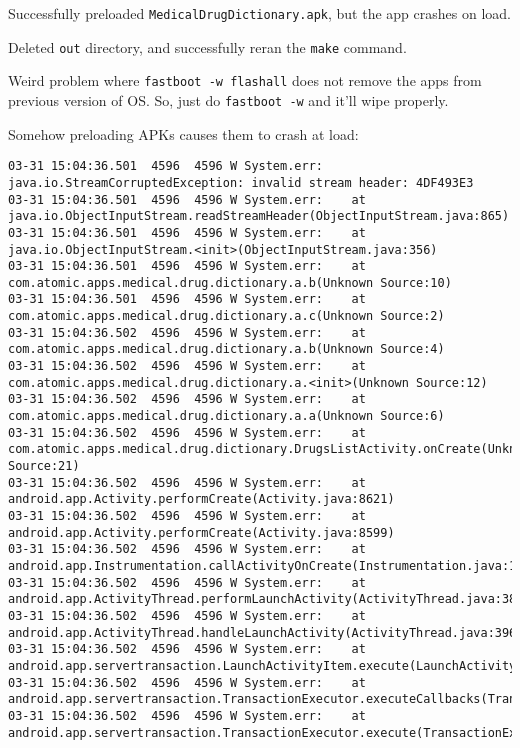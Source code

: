 Successfully preloaded \texttt{MedicalDrugDictionary.apk}, but the app crashes on load.

Deleted \texttt{out} directory, and successfully reran the \texttt{make} command.

Weird problem where \texttt{fastboot -w flashall} does not remove the apps from previous version of OS. So, just do \texttt{fastboot -w} and it'll wipe properly.

Somehow preloading APKs causes them to crash at load:
\begin{lstlisting}
03-31 15:04:36.501  4596  4596 W System.err: java.io.StreamCorruptedException: invalid stream header: 4DF493E3
03-31 15:04:36.501  4596  4596 W System.err: 	at java.io.ObjectInputStream.readStreamHeader(ObjectInputStream.java:865)
03-31 15:04:36.501  4596  4596 W System.err: 	at java.io.ObjectInputStream.<init>(ObjectInputStream.java:356)
03-31 15:04:36.501  4596  4596 W System.err: 	at com.atomic.apps.medical.drug.dictionary.a.b(Unknown Source:10)
03-31 15:04:36.501  4596  4596 W System.err: 	at com.atomic.apps.medical.drug.dictionary.a.c(Unknown Source:2)
03-31 15:04:36.502  4596  4596 W System.err: 	at com.atomic.apps.medical.drug.dictionary.a.b(Unknown Source:4)
03-31 15:04:36.502  4596  4596 W System.err: 	at com.atomic.apps.medical.drug.dictionary.a.<init>(Unknown Source:12)
03-31 15:04:36.502  4596  4596 W System.err: 	at com.atomic.apps.medical.drug.dictionary.a.a(Unknown Source:6)
03-31 15:04:36.502  4596  4596 W System.err: 	at com.atomic.apps.medical.drug.dictionary.DrugsListActivity.onCreate(Unknown Source:21)
03-31 15:04:36.502  4596  4596 W System.err: 	at android.app.Activity.performCreate(Activity.java:8621)
03-31 15:04:36.502  4596  4596 W System.err: 	at android.app.Activity.performCreate(Activity.java:8599)
03-31 15:04:36.502  4596  4596 W System.err: 	at android.app.Instrumentation.callActivityOnCreate(Instrumentation.java:1456)
03-31 15:04:36.502  4596  4596 W System.err: 	at android.app.ActivityThread.performLaunchActivity(ActivityThread.java:3804)
03-31 15:04:36.502  4596  4596 W System.err: 	at android.app.ActivityThread.handleLaunchActivity(ActivityThread.java:3963)
03-31 15:04:36.502  4596  4596 W System.err: 	at android.app.servertransaction.LaunchActivityItem.execute(LaunchActivityItem.java:103)
03-31 15:04:36.502  4596  4596 W System.err: 	at android.app.servertransaction.TransactionExecutor.executeCallbacks(TransactionExecutor.java:139)
03-31 15:04:36.502  4596  4596 W System.err: 	at android.app.servertransaction.TransactionExecutor.execute(TransactionExecutor.java:96)

\end{lstlisting}
